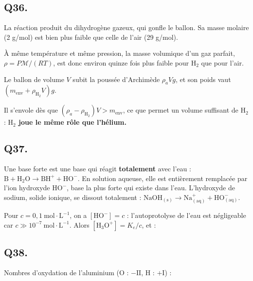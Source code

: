 \documentclass[11pt,a4paper]{article}
\newcommand{\equationajustee}[1]{%
  \sbox{\boiteequation}{$\displaystyle #1$}%
  \ifdim\wd\boiteequation>\linewidth
    \[\resizebox{\linewidth}{!}{\usebox{\boiteequation}}\]%
  \else
    \[#1\]%
  \fi}
\begin{document}
\hypertarget{q36.}{%
\subsection{Q36.}\label{q36.}}

La réaction produit du dihydrogène gazeux, qui gonfle le ballon. Sa masse molaire (2 g/mol) est bien plus faible que celle de l'air (29 g/mol).

À même température et même pression, la masse volumique d'un gaz parfait, \(\rho=P\mathcal M/(RT)\), est donc environ quinze fois plus faible pour \(\mathrm H_2\) que pour l'air.

Le ballon de volume \(V\) subit la poussée d'Archimède \(\rho_aVg\), et son poids vaut \((m_{\text{env}}+\rho_{\mathrm H_2}V)g\).

Il s'envole dès que \((\rho_a-\rho_{\mathrm H_2})V>m_{\text{env}}\), ce que permet un volume suffisant de \(\mathrm H_2\) : \textbf{\(\mathrm H_2\) joue le même rôle que l'hélium.}

\hypertarget{q37.}{%
\subsection{Q37.}\label{q37.}}

Une base forte est une base qui réagit \textbf{totalement} avec l'eau : \(\mathrm B+\mathrm H_2\mathrm O\to\mathrm{BH^+}+\mathrm{HO^-}\). En solution aqueuse, elle est entièrement remplacée par l'ion hydroxyde \(\mathrm{HO^-}\), base la plus forte qui existe dans l'eau. L'hydroxyde de sodium, solide ionique, se dissout totalement : \(\mathrm{NaOH_{(s)}}\to\mathrm{Na^+_{(aq)}}+\mathrm{HO^-_{(aq)}}\).

Pour \(c=0{,}1\ \mathrm{mol\cdot L^{-1}}\), on a \([\mathrm{HO^-}]=c\) : l'autoprotolyse de l'eau est négligeable car \(c\gg10^{-7}\ \mathrm{mol\cdot L^{-1}}\). Alors \([\mathrm{H_3O^+}]=K_e/c\), et :

\equationajustee{\begin{aligned}
\mathrm{pH}&=\mathrm pK_e+\log c\\
&=14-1=\boxed{13}
\end{aligned}}

\hypertarget{q38.}{%
\subsection{Q38.}\label{q38.}}

Nombres d'oxydation de l'aluminium (O : \(-\mathrm{II}\), H : \(+\mathrm I\)) :
\end{document}
